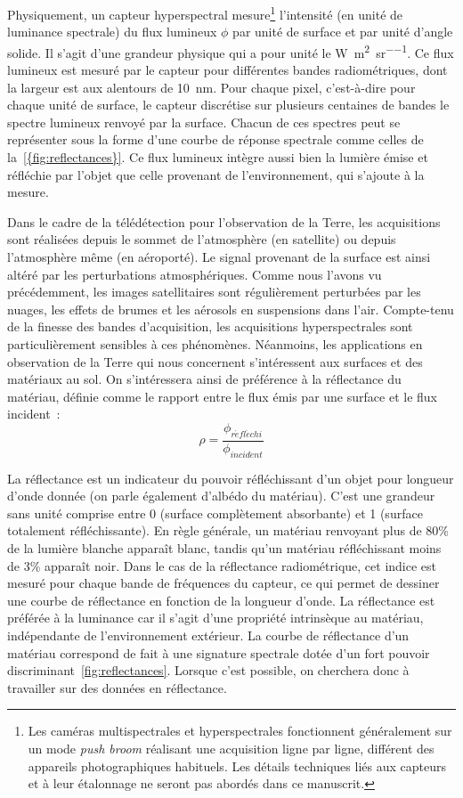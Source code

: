 Physiquement, un capteur hyperspectral mesure\footnote{Les caméras multispectrales et hyperspectrales fonctionnent généralement sur un mode \emph{push broom} réalisant une acquisition ligne par ligne, différent des appareils photographiques habituels. Les détails techniques liés aux capteurs et à leur étalonnage ne seront pas abordés dans ce manuscrit.} l'intensité (en unité de luminance spectrale) du flux lumineux $\phi$ par unité de surface et par unité d'angle solide. Il s'agit d'une grandeur physique qui a pour unité le \si{\watt\per\square\meter\per\steradian}. Ce flux lumineux est mesuré par le capteur pour différentes bandes radiométriques, dont la largeur est aux alentours de \SI{10}{\nano\meter}. Pour chaque pixel, c'est-à-dire pour chaque unité de surface, le capteur discrétise sur plusieurs centaines de bandes le spectre lumineux renvoyé par la surface. Chacun de ces spectres peut se représenter sous la forme d'une courbe de réponse spectrale comme celles de la~\cref{{fig:reflectances}}. Ce flux lumineux intègre aussi bien la lumière émise et réfléchie par l'objet que celle provenant de l'environnement, qui s'ajoute à la mesure.

Dans le cadre de la télédétection pour l'observation de la Terre, les acquisitions sont réalisées depuis le sommet de l'atmosphère (en satellite) ou depuis l'atmosphère même (en aéroporté). Le signal provenant de la surface est ainsi altéré par les perturbations atmosphériques. Comme nous l'avons vu précédemment, les images satellitaires sont régulièrement perturbées par les nuages, les effets de brumes et les aérosols en suspensions dans l'air. Compte-tenu de la finesse des bandes d'acquisition, les acquisitions hyperspectrales sont particulièrement sensibles à ces phénomènes. Néanmoins, les applications en observation de la Terre qui nous concernent s'intéressent aux surfaces et des matériaux au sol. On s'intéressera ainsi de préférence à la réflectance du matériau, définie comme le rapport entre le flux émis par une surface et le flux incident~:
\begin{equation}
  \rho = \frac{\phi_{\mathit{r\acute{e}fl\acute{e}chi}}}{\phi_\mathit{incident}}
\end{equation}

La réflectance est un indicateur du pouvoir réfléchissant d'un objet pour longueur d'onde donnée (on parle également d'albédo du matériau). C'est une grandeur sans unité comprise entre 0 (surface complètement absorbante) et 1 (surface totalement réfléchissante). En règle générale, un matériau renvoyant plus de 80\% de la lumière blanche apparaît blanc, tandis qu'un matériau réfléchissant moins de 3\% apparaît noir. Dans le cas de la réflectance radiométrique, cet indice est mesuré pour chaque bande de fréquences du capteur, ce qui permet de dessiner une courbe de réflectance en fonction de la longueur d'onde. La réflectance est préférée à la luminance car il s'agit d'une propriété intrinsèque au matériau, indépendante de l'environnement extérieur. La courbe de réflectance d'un matériau correspond de fait à une signature spectrale dotée d'un fort pouvoir discriminant~\cref{fig:reflectances}. Lorsque c'est possible, on cherchera donc à travailler sur des données en réflectance.

